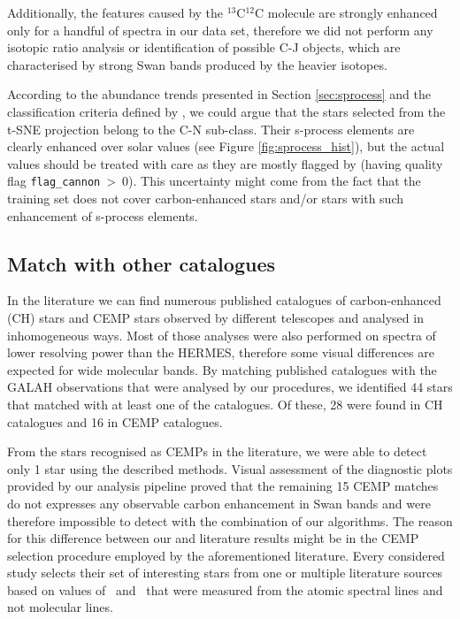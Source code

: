 Additionally, the features caused by the $^{13}$C$^{12}$C molecule are strongly enhanced only for a handful of spectra in our data set, therefore we did not perform any isotopic ratio analysis or identification of possible C-J objects, which are characterised by strong Swan bands produced by the heavier isotopes.

According to the abundance trends presented in Section \ref{sec:sprocess} and the classification criteria defined by \citet{1996ApJS..105..419B}, we could argue that the stars selected from the t-SNE projection belong to the C-N sub-class. Their s-process elements are clearly enhanced over solar values (see Figure \ref{fig:sprocess_hist}), but the actual values should be treated with care as they are mostly flagged by \TC (having quality flag \texttt{flag\_cannon}~>~0). This uncertainty might come from the fact that the training set does not cover carbon-enhanced stars and/or stars with such enhancement of s-process elements.

\subsection{Match with other catalogues}
In the literature we can find numerous published catalogues of carbon-enhanced (CH) stars \cite{2001A&A...375..366C, 2001BaltA..10....1A,2016ApJS..226....1J} and CEMP stars \cite{2007ApJ...658..367K, 2010A&A...509A..93M, 2010AJ....139.1051P, 2014ApJ...797...21P, 2015A&A...581A..22A, 2017yCat..18330020Y} observed by different telescopes and analysed in inhomogeneous ways. Most of those analyses were also performed on spectra of lower resolving power than the HERMES, therefore some visual differences are expected for wide molecular bands. By matching published catalogues with the GALAH observations that were analysed by our procedures, we identified 44 stars that matched with at least one of the catalogues. Of these, 28 were found in CH catalogues and 16 in CEMP catalogues.

From the stars recognised as CEMPs in the literature, we were able to detect only 1 star using the described methods. Visual assessment of the diagnostic plots provided by our analysis pipeline proved that the remaining 15 CEMP matches do not expresses any observable carbon enhancement in Swan bands and were therefore impossible to detect with the combination of our algorithms. The reason for this difference between our and literature results might be in the CEMP selection procedure employed by the aforementioned literature. Every considered study selects their set of interesting stars from one or multiple literature sources based on values of \Meh\ and \Cfe\ that were measured from the atomic spectral lines and not molecular lines. 

